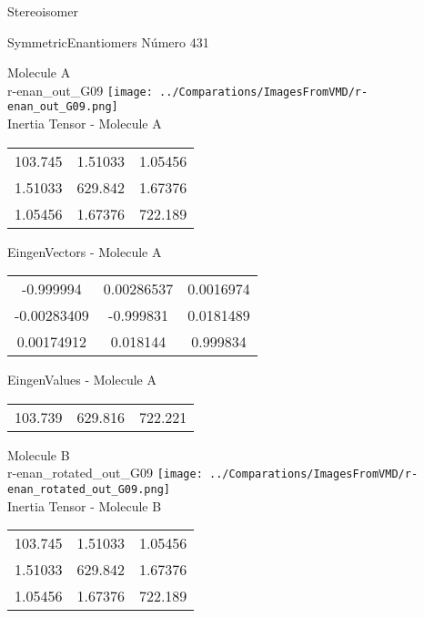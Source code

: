 \begin{center}
\vtab
\vtab
\textcolor{NavyBlue}{\Large Stereoisomer}
\end{center}

 \newpage

\vtab[-2cm]
\begin{center}
{\large SymmetricEnantiomers \tab Número 431}
\end{center}
\begin{multicols}{2}
\begin{center}

Molecule A \\ 
r-enan\_out\_G09
\texttt{[image: ../Comparations/ImagesFromVMD/r-enan\_out\_G09.png]}
\\
Inertia Tensor - Molecule A \\
\vtab

\begin{tabular}{|c c c|}
103.745	 & 	1.51033	 & 	1.05456	 \\
1.51033	 & 	629.842	 & 	1.67376	 \\
1.05456	 & 	1.67376	 & 	722.189
\end{tabular}

\vtab
 EingenVectors - Molecule A     \\
\vtab
\begin{tabular}{|c c c|}
-0.999994	 & 	0.00286537	 & 	0.0016974	 \\
-0.00283409	 & 	-0.999831	 & 	0.0181489	 \\
0.00174912	 & 	0.018144	 & 	0.999834
\end{tabular}

\vtab
 EingenValues - Molecule A     \\
\vtab
\begin{tabular}{|c c c|}
103.739	 & 	629.816	 & 	722.221	 \\
\end{tabular}
\columnbreak

Molecule B \\ 
r-enan\_rotated\_out\_G09
\texttt{[image: ../Comparations/ImagesFromVMD/r-enan\_rotated\_out\_G09.png]}
\\
Inertia Tensor - Molecule B \\
\vtab

\begin{tabular}{|c c c|}
103.745	 & 	1.51033	 & 	1.05456	 \\
1.51033	 & 	629.842	 & 	1.67376	 \\
1.05456	 & 	1.67376	 & 	722.189
\end{tabular}


\end{center}
\end{multicols}
